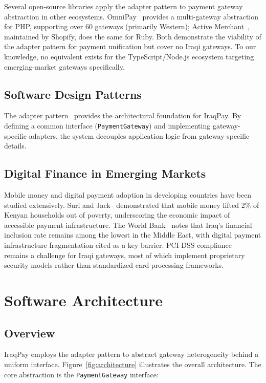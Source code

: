 \documentclass[10pt, a4paper, oneside]{article}
\begin{document}
Several open-source libraries apply the adapter pattern to payment gateway abstraction in other ecosystems. OmniPay~\cite{omnipay2024} provides a multi-gateway abstraction for PHP, supporting over 60 gateways (primarily Western); Active Merchant~\cite{activemerchant2024}, maintained by Shopify, does the same for Ruby. Both demonstrate the viability of the adapter pattern for payment unification but cover no Iraqi gateways. To our knowledge, no equivalent exists for the TypeScript/Node.js ecosystem targeting emerging-market gateways specifically.

\subsection{Software Design Patterns}

The adapter pattern~\cite{gamma1994} provides the architectural foundation for IraqPay. By defining a common interface (\texttt{PaymentGateway}) and implementing gateway-specific adapters, the system decouples application logic from gateway-specific details.

\subsection{Digital Finance in Emerging Markets}

Mobile money and digital payment adoption in developing countries have been studied extensively. Suri and Jack~\cite{suri2016} demonstrated that mobile money lifted 2\% of Kenyan households out of poverty, underscoring the economic impact of accessible payment infrastructure. The World Bank~\cite{worldbank2023} notes that Iraq's financial inclusion rate remains among the lowest in the Middle East, with digital payment infrastructure fragmentation cited as a key barrier. PCI-DSS compliance~\cite{pcidss2022} remains a challenge for Iraqi gateways, most of which implement proprietary security models rather than standardized card-processing frameworks.


\section{Software Architecture}

\subsection{Overview}

IraqPay employs the adapter pattern to abstract gateway heterogeneity behind a uniform interface. Figure~\ref{fig:architecture} illustrates the overall architecture. The core abstraction is the \texttt{PaymentGateway} interface:
\end{document}
